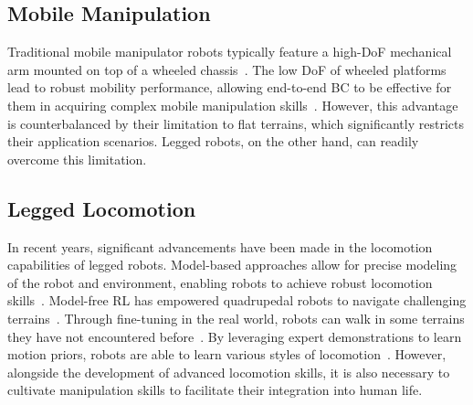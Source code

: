 \label{sec:review}



\subsection{Mobile Manipulation}

Traditional mobile manipulator robots typically feature a high-DoF mechanical arm mounted on top of a wheeled chassis~\cite{wu2023tidybot, xiong2024adaptive,fu2024mobile,shafiullah2023bringing,wu2023m,yokoyama2023adaptive,srivastava2022behavior}. 
The low DoF of wheeled platforms lead to robust mobility performance, allowing end-to-end BC to be effective for them in acquiring complex mobile manipulation skills~\cite{shafiullah2023bringing,fu2024mobile}. However, this advantage is counterbalanced by their limitation to flat terrains, which significantly restricts their application scenarios. Legged robots, on the other hand, can readily overcome this limitation.

\subsection{Legged Locomotion}

In recent years, significant advancements have been made in the locomotion capabilities of legged robots. Model-based approaches allow for precise modeling of the robot and environment, enabling robots to achieve robust locomotion skills~\cite{grandia2022perceptive,dtc,ding2021representation}.
Model-free RL has empowered quadrupedal robots to navigate challenging terrains~\cite{cheng2023parkour,zhuang2023robot,hoeller2023anymal,miki2024confined,agarwal2023legged,choi2023deformable}.
Through fine-tuning in the real world, robots can walk in some terrains they have not encountered before~\cite{lei2023uni,smith2022legged}.
By leveraging expert demonstrations to learn motion priors, robots are able to learn various styles of locomotion~\cite{yang2023generalized,wu2023amp,vollenweider2023amp,peng2021amp}.
However, alongside the development of advanced locomotion skills, it is also necessary to cultivate manipulation skills to facilitate their integration into human life.



